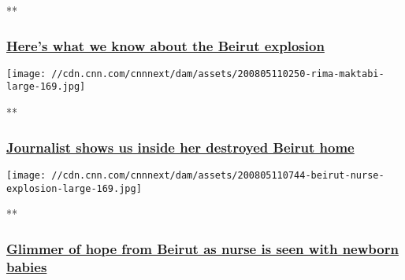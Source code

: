**

\hypertarget{heres-what-we-know-about-the-beirut-explosion}{%
\subsubsection{\texorpdfstring{\href{/videos/world/2020/08/04/beirut-explosion-video-mss-orig.cnn/video/playlists/beirut-explosion/}{Here's
what we know about the Beirut
explosion}}{Here's what we know about the Beirut explosion}}\label{heres-what-we-know-about-the-beirut-explosion}}

\href{/videos/world/2020/08/05/rima-maktabi-journalist-home-destroyed-beirut-explosion-ctw-vpx.cnn/video/playlists/beirut-explosion/}{}

\texttt{[image: //cdn.cnn.com/cnnnext/dam/assets/200805110250-rima-maktabi-large-169.jpg]}

**

\hypertarget{journalist-shows-us-inside-her-destroyed-beirut-home}{%
\subsubsection{\texorpdfstring{\href{/videos/world/2020/08/05/rima-maktabi-journalist-home-destroyed-beirut-explosion-ctw-vpx.cnn/video/playlists/beirut-explosion/}{Journalist
shows us inside her destroyed Beirut
home}}{Journalist shows us inside her destroyed Beirut home}}\label{journalist-shows-us-inside-her-destroyed-beirut-home}}

\href{/videos/world/2020/08/05/lebanon-beirut-explosion-blast-nurse-three-babies-picture-ctw-intl-ldn-vpx.cnn/video/playlists/beirut-explosion/}{}

\texttt{[image: //cdn.cnn.com/cnnnext/dam/assets/200805110744-beirut-nurse-explosion-large-169.jpg]}

**

\hypertarget{glimmer-of-hope-from-beirut-as-nurse-is-seen-with-newborn-babies-}{%
\subsubsection{\texorpdfstring{\href{/videos/world/2020/08/05/lebanon-beirut-explosion-blast-nurse-three-babies-picture-ctw-intl-ldn-vpx.cnn/video/playlists/beirut-explosion/}{Glimmer
of hope from Beirut as nurse is seen with newborn babies
}}{Glimmer of hope from Beirut as nurse is seen with newborn babies }}\label{glimmer-of-hope-from-beirut-as-nurse-is-seen-with-newborn-babies-}}

\href{/videos/world/2020/08/04/beirut-lebanon-explosion-ben-wedeman-live-amanpour-vpx.cnn/video/playlists/beirut-explosion/}{}

